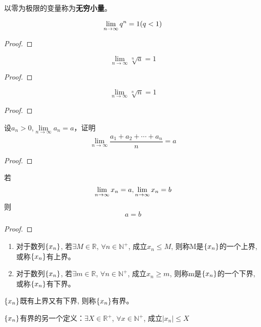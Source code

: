 \documentclass[lang=cn]{elegantbook}
\begin{document}
\begin{definition}[无穷小量的定义]
    以零为极限的变量称为{\bf 无穷小量}。
\end{definition}

\begin{proposition}
    \[ \lim_{n \to \infty } q^n= 1(q < 1) \]
\end{proposition}
    \begin{proof}
        
    \end{proof}

\begin{proposition}
\[ \lim_{n \to \infty } \sqrt[n]{a}= 1 \]
\end{proposition}
\begin{proof}
    
\end{proof}

\begin{proposition}
\[ \lim_{n \to \infty } \sqrt[n]{n}= 1 \]
\end{proposition}
\begin{proof}
    
\end{proof}


\begin{proposition}
    设$a_n > 0$,$\lim\limits_{n \to \infty} a_n = a$，证明
    \[ \lim_{n \to \infty}\frac{a_1+a_2+\cdots+a_n}{n} = a \]
\end{proposition}
\begin{proof}
    
\end{proof}

\begin{theorem}[数列极限的唯一性]
    若
    \[ \lim_{n \to \infty } x_n = a, \lim_{n \to \infty } x_n = b \]
    则
    \[  a = b \]
\end{theorem}
\begin{proof}
    
\end{proof}


\begin{definition}
    \begin{enumerate}
        \item 对于数列$\left\{ x_n\right\}$, 若$\exists M \in \mathbb{R}$, $\forall n \in \mathbb{N}^+$, 成立$x_n \le M$, 则称M是$\left\{ x_n\right\}$的一个上界, 或称$\left\{ x_n\right\}$有上界。
        \item 对于数列$\left\{ x_n\right\}$, 若$\exists m \in \mathbb{R}$, $\forall n \in \mathbb{N}^+$, 成立$x_n \ge m$, 则称m是$\left\{ x_n\right\}$的一个下界, 或称$\left\{ x_n\right\}$有下界。
    \end{enumerate}
    $\left\{ x_n\right\}$既有上界又有下界, 则称$\left\{ x_n\right\}$有界。

    $\left\{ x_n\right\}$有界的另一个定义：$\exists X \in \mathbb{R}^+$, $\forall x \in \mathbb{N}^+$, 成立$\left| x_n \right| \le X$
\end{definition}
\end{document}
